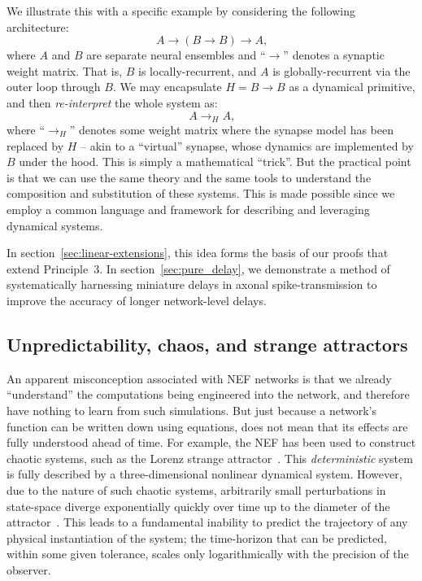 We illustrate this with a specific example by considering the following architecture:
$$A \rightarrow (B \rightarrow B) \rightarrow A \text{,}$$
where $A$ and $B$ are separate neural ensembles and ``$\rightarrow$'' denotes a synaptic weight matrix.
That is, $B$ is locally-recurrent, and $A$ is globally-recurrent via the outer loop through $B$.
We may encapsulate $H = B \rightarrow B$ as a dynamical primitive, and then \emph{re-interpret} the whole system as:
$$A \rightarrow_H A \text{,}$$
where ``$\rightarrow_H$'' denotes some weight matrix where the synapse model has been replaced by $H$ --
akin to a ``virtual'' synapse, whose dynamics are implemented by $B$ under the hood.
This is simply a mathematical ``trick''.
But the practical point is that we can use the same theory and the same tools to understand the composition and substitution of these systems.
This is made possible since we employ a common language and framework for describing and leveraging dynamical systems.

In section~\ref{sec:linear-extensions}, this idea forms the basis of our proofs that extend Principle~3.
In section~\ref{sec:pure_delay}, we demonstrate a method of systematically harnessing miniature delays in axonal spike-transmission to improve the accuracy of longer network-level delays.


\subsection{Unpredictability, chaos, and strange attractors}
\label{sec:chaos}

An apparent misconception associated with NEF networks is that we already ``understand'' the computations being engineered into the network, and therefore have nothing to learn from such simulations.
But just because a network's function can be written down using equations, does not mean that its effects are fully understood ahead of time.
For example, the NEF has been used to construct chaotic systems, such as the Lorenz strange attractor~\citep{eliasmith2005b}.
This \emph{deterministic} system is fully described by a three-dimensional nonlinear dynamical system.
However, due to the nature of such chaotic systems, arbitrarily small perturbations in state-space diverge exponentially quickly over time up to the diameter of the attractor~\citep[][pp.~328--330]{strogatz2000nonlinear}.
This leads to a fundamental inability to predict the trajectory of any physical instantiation of the system; the time-horizon that can be predicted, within some given tolerance, scales only logarithmically with the precision of the observer.


